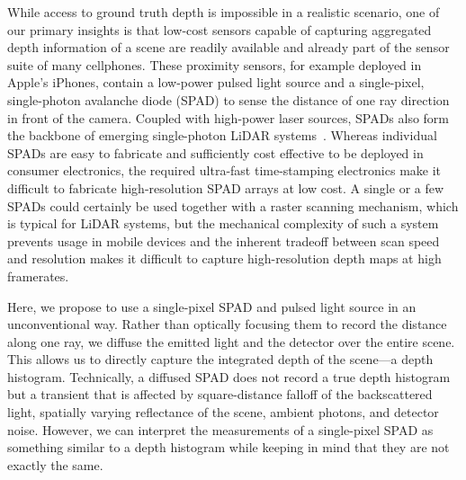 
While access to ground truth depth is impossible in a realistic scenario, one of our primary insights is that low-cost sensors capable of capturing aggregated depth information of a scene are readily available and already part of the sensor suite of many cellphones. These proximity sensors, for example deployed in Apple's iPhones, contain a low-power pulsed light source and a single-pixel, single-photon avalanche diode (SPAD) to sense the distance of one ray direction in front of the camera. Coupled with high-power laser sources, SPADs also form the backbone of emerging single-photon LiDAR systems~\cite{Kirmani:2014,pawlikowska2017single,Li:2019}. Whereas individual SPADs are easy to fabricate and sufficiently cost effective to be deployed in consumer electronics, the required ultra-fast time-stamping electronics make it difficult to fabricate high-resolution SPAD arrays at low cost. A single or a few SPADs could certainly be used together with a raster scanning mechanism, which is typical for LiDAR systems, but the mechanical complexity of such a system prevents usage in mobile devices and the inherent tradeoff between scan speed and resolution makes it difficult to capture high-resolution depth maps at high framerates.

Here, we propose to use a single-pixel SPAD and pulsed light source in an unconventional way. Rather than optically focusing them to record the distance along one ray, we diffuse the emitted light and the detector over the entire scene. This allows us to directly capture the integrated depth of the scene---a depth histogram. Technically, a diffused SPAD does not record a true depth histogram but a transient that is affected by square-distance falloff of the backscattered light, spatially varying reflectance of the scene, ambient photons, and detector noise. However, we can interpret the measurements of a single-pixel SPAD as something similar to a depth histogram while keeping in mind that they are not exactly the same.

